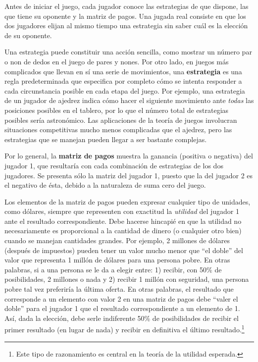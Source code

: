 \documentclass[12pt]{article}
\begin{document}
Antes de iniciar el juego, cada jugador conoce las estrategias de que dispone, las que tiene su oponente y la matriz de pagos. Una jugada real consiste en que los dos jugadores elijan al mismo tiempo una estrategia sin saber cuál es la elección de su oponente.

Una estrategia puede constituir una acción sencilla, como mostrar un número par o non de dedos en el juego de pares y nones. Por otro lado, en juegos más complicados que llevan en sí una serie de movimientos, una \textbf{estrategia} es una regla predeterminada que especifica por completo cómo se intenta responder a cada circunstancia posible en cada etapa del juego. Por ejemplo, una estrategia de un jugador de ajedrez indica cómo hacer el siguiente movimiento ante \textit{todas} las posiciones posibles en el tablero, por lo que el número total de estrategias posibles sería astronómico. Las aplicaciones de la teoría de juegos involucran situaciones competitivas mucho menos complicadas que el ajedrez, pero las estrategias que se manejan pueden llegar a ser bastante complejas.

Por lo general, la \textbf{matriz de pagos} muestra la ganancia (positiva o negativa) del jugador 1, que resultaría con cada combinación de estrategias de los dos jugadores. Se presenta sólo la matriz del jugador 1, puesto que la del jugador 2 es el negativo de ésta, debido a la naturaleza de suma cero del juego.

Los elementos de la matriz de pagos pueden expresar cualquier tipo de unidades, como dólares, siempre que representen con exactitud la \textit{utilidad} del jugador 1 ante el resultado correspondiente. Debe hacerse hincapié en que la utilidad no necesariamente es proporcional a la cantidad de dinero (o cualquier otro bien) cuando se manejan cantidades grandes. Por ejemplo, 2 millones de dólares (después de impuestos) pueden tener un valor mucho menor que “el doble” del valor que representa 1 millón de dólares para una persona pobre. En otras palabras, si a una persona se le da a elegir entre: 1) recibir, con 50\% de posibilidades, 2 millones o nada y 2) recibir 1 millón con seguridad, una persona pobre tal vez preferiría la última oferta. En otras palabras, el resultado que corresponde a un elemento con valor 2 en una matriz de pagos debe “valer el doble” para el jugador 1 que el resultado correspondiente a un elemento de 1. Así, dada la elección, debe serle indiferente 50\% de posibilidades de recibir el primer resultado (en lugar de nada) y recibir en definitiva el último resultado.\footnote{Este tipo de razonamiento es central en la teoría de la utilidad esperada.}
\end{document}
